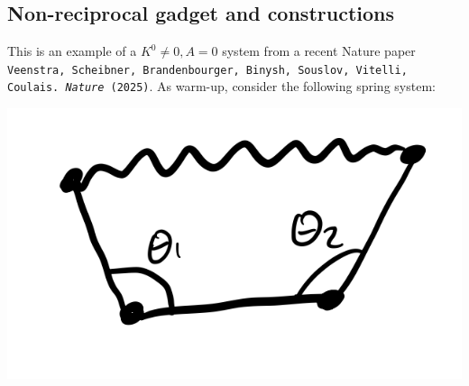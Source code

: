 \subsection{Non-reciprocal gadget and constructions}
This is an example of a $K^0 \neq 0, A = 0$ system from a recent Nature paper \texttt{Veenstra, Scheibner, Brandenbourger, Binysh, Souslov, Vitelli, Coulais. \emph{Nature} (2025)}. As warm-up, consider the following spring system:

\begin{center}
    \includegraphics[scale=0.35]{Lectures/Images/lec3-gadgetwithspring.png}
\end{center}

